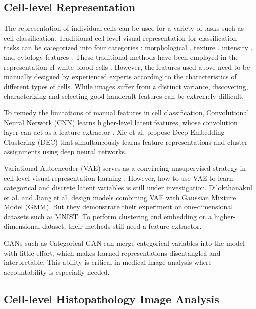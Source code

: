 \documentclass[journal]{IEEEtran}
\begin{document}
\subsection{Cell-level Representation}

The representation of individual cells can be used for a variety of tasks such as cell classification. Traditional cell-level visual representation for classification tasks can be categorized into four categories \cite{Y2014Methods}: morphological \cite{Muthu2012Hybrid}, texture \cite{Xu2015Dual,Lorenzo2013Cervical}, intensity \cite{Dundar2011Computerized}, and cytology features \cite{Nguyen2011Prostate}. These traditional methods have been employed in the representation of white blood cells \cite{Tai2011Blood,Putzu2014Leucocyte,Su2014A}. However, the features used above need to be manually designed by experienced experts according to the characteristics of different types of cells. While images suffer from a distinct variance, discovering, characterizing and selecting good handcraft features can be extremely difficult.

To remedy the limitations of manual features in cell classification, Convolutional Neural Network (CNN) learns higher-level latent features, whose convolution layer can act as a feature extractor \cite{xu2017large}. Xie et al. \cite{xie2016unsupervised} propose Deep Embedding Clustering (DEC) that simultaneously learns feature representations and cluster assignments using deep neural networks.

Variational Autoencoder (VAE) \cite{kingma2013auto} serves as a convincing unsupervised strategy in cell-level visual representation learning \cite{Xu2016Stacked,Cruzroa2013A, zhang2016fusing}. However, how to use VAE to learn categorical and discrete latent variables is still under investigation. Dilokthanakul et al. \cite{dilokthanakul2016deep} and Jiang et al. \cite{jiang2017variational} design models combining VAE with Gaussian Mixture Model (GMM). But they demonstrate their experiment on one-dimensional datasets such as MNIST. To perform clustering and embedding on a higher-dimensional dataset, their methods still need a feature extractor.

GANs such as Categorical GAN \cite{springenberg2015unsupervised} can merge categorical variables into the model with little effort, which makes learned representations disentangled and interpretable. This ability is critical in medical image analysis where accountability is especially needed.

\subsection{Cell-level Histopathology Image Analysis}
\end{document}
